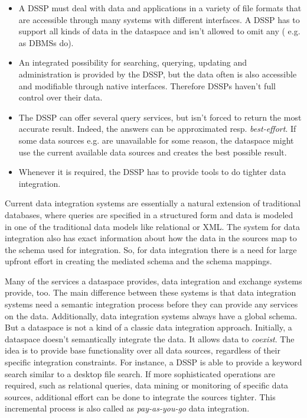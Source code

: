 \begin{itemize}
\item A DSSP must deal with data and applications in a variety of file formats that are accessible through many systems with different interfaces. A DSSP has to support all kinds of data in the dataspace and isn't allowed to omit any ( e.g. as DBMSs do).

\item An integrated possibility for searching, querying, updating and administration is provided by the DSSP, but the data often is also accessible and modifiable through native interfaces. Therefore DSSPs haven't full control over their data.

\item The DSSP can offer several query services, but isn't forced to return the most accurate result. Indeed,  the answers can be approximated resp. \emph{best-effort}. If some data sources e.g. are unavailable for some reason, the dataspace might use the current available data sources and creates the best possible result.

\item Whenever it is required, the DSSP has to provide tools to do tighter data integration.
\end{itemize}

Current data integration systems are essentially a natural extension of traditional databases, where queries are specified in a structured form and data is modeled in one of the traditional data models like relational or XML. The system for data integration also has exact information about how the data in the sources map to the schema used for integration. So, for data integration there is a need for large upfront effort in creating the mediated schema and the schema mappings.

Many of the services a dataspace provides, data integration and exchange systems provide, too. The main difference between these systems is that data integration systems need a semantic integration process before they can provide any services on the data. Additionally, data integration systems always have a global schema. But a dataspace is not a kind of a classic data integration approach. Initially, a dataspace doesn't semantically integrate the data. It allows data to \emph{coexist}.  The idea is to provide base functionality over all data sources, regardless of their specific integration constraints. For instance, a DSSP is able to provide a keyword search similar to a desktop file search. If more sophisticated operations are required, such as relational queries, data mining or monitoring of specific data sources, additional effort can be done to integrate the sources tighter. This incremental process is also called as \emph{pay-as-you-go} data integration.

